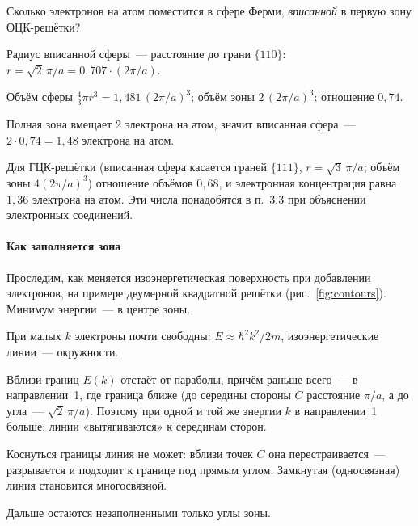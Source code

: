 \begin{primer}
Сколько электронов на атом поместится в сфере Ферми, \emph{вписанной}
в первую зону ОЦК-решётки?
\begin{shagi}
\item Радиус вписанной сферы~— расстояние до грани $\{110\}$:
$r=\sqrt2\,\pi/a=0{,}707\cdot(2\pi/a)$.
\item Объём сферы $\frac43\pi r^3=1{,}481\,(2\pi/a)^3$; объём зоны
$2\,(2\pi/a)^3$; отношение $0{,}74$.
\item Полная зона вмещает 2 электрона на атом, значит вписанная сфера~—
$2\cdot0{,}74=1{,}48$ электрона на атом.
\end{shagi}
Для ГЦК-решётки (вписанная сфера касается граней $\{111\}$,
$r=\sqrt3\,\pi/a$; объём зоны $4(2\pi/a)^3$) отношение объёмов $0{,}68$,
и электронная концентрация равна $1{,}36$ электрона на атом. Эти числа
понадобятся в п.~3.3 при объяснении электронных соединений.
\end{primer}

\paragraph{Как заполняется зона}
Проследим, как меняется изоэнергетическая поверхность при добавлении
электронов, на примере двумерной квадратной решётки
(рис.~\ref{fig:contours}). Минимум энергии~— в центре зоны.
\begin{shagi}
\item При малых $k$ электроны почти свободны: $E\approx\hbar^2k^2/2m$,
изоэнергетические линии~— окружности.
\item Вблизи границ $E(k)$ отстаёт от параболы, причём раньше всего~— в
направлении~1, где граница ближе (до середины стороны $C$ расстояние
$\pi/a$, а до угла~— $\sqrt2\,\pi/a$). Поэтому при одной и той же энергии
$k$ в направлении~1 больше: линии «вытягиваются» к серединам сторон.
\item Коснуться границы линия не может: вблизи точек $C$ она
перестраивается~— разрывается и подходит к границе под прямым углом.
Замкнутая (односвязная) линия становится многосвязной.
\item Дальше остаются незаполненными только углы зоны.
\end{shagi}

